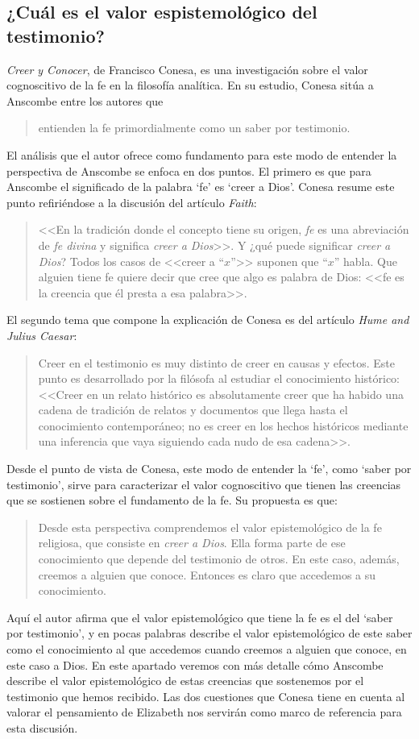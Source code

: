 \subsection{¿Cuál es el valor espistemológico del testimonio?}

\emph{Creer y Conocer}, de Francisco Conesa, es una investigación sobre el valor cognoscitivo de la fe en la filosofía analítica. En su estudio, Conesa sitúa a Anscombe entre los autores que \blockquote[{\cite[84]{conesa1994cc}}]{entienden la fe primordialmente como un saber por testimonio.} El análisis que el autor ofrece como fundamento para este modo de entender la perspectiva de Anscombe se enfoca en dos puntos. El primero es que para Anscombe el significado de la palabra `fe' es `creer a Dios'. Conesa resume este punto refiriéndose a la discusión del artículo \emph{Faith}: \blockquote[{\cite[87--88]{conesa1994cc}}]{<<En la tradición donde el concepto tiene su origen, \emph{fe} es una abreviación de \emph{fe divina} y significa \emph{creer a Dios}>>. Y ¿qué puede significar \emph{creer a Dios}? Todos los casos de <<creer a ``$x$''>> suponen que ``$x$'' habla. Que alguien tiene fe quiere decir que cree que algo es palabra de Dios: <<fe es la creencia que él presta a esa palabra>>.} El segundo tema que compone la explicación de Conesa es del artículo \emph{Hume and Julius Caesar}: \blockquote[{\cite[88]{conesa1994cc}}]{Creer en el testimonio es muy distinto de creer en causas y efectos. Este punto es desarrollado por la filósofa al estudiar el conocimiento histórico: <<Creer en un relato histórico es absolutamente creer que ha habido una cadena de tradición de relatos y documentos que llega hasta el conocimiento contemporáneo; no es creer en los hechos históricos mediante una inferencia que vaya siguiendo cada nudo de esa cadena>>.}

Desde el punto de vista de Conesa, este modo de entender la `fe', como `saber por testimonio', sirve para caracterizar el valor cognoscitivo que tienen las creencias que se sostienen sobre el fundamento de la fe. Su propuesta es que: \blockquote[{\cite[88]{conesa1994cc}}]{Desde esta perspectiva comprendemos el valor epistemológico de la fe religiosa, que consiste en \emph{creer a Dios}. Ella forma parte de ese conocimiento que depende del testimonio de otros. En este caso, además, creemos a alguien que conoce. Entonces es claro que accedemos a su conocimiento.} Aquí el autor afirma que el valor epistemológico que tiene la fe es el del `saber por testimonio', y en pocas palabras describe el valor epistemológico de este saber como el conocimiento al que accedemos cuando creemos a alguien que conoce, en este caso a Dios. En este apartado veremos con más detalle cómo Anscombe describe el valor epistemológico de estas creencias que sostenemos por el testimonio que hemos recibido. Las dos cuestiones que Conesa tiene en cuenta al valorar el pensamiento de Elizabeth nos servirán como marco de referencia para esta discusión.

